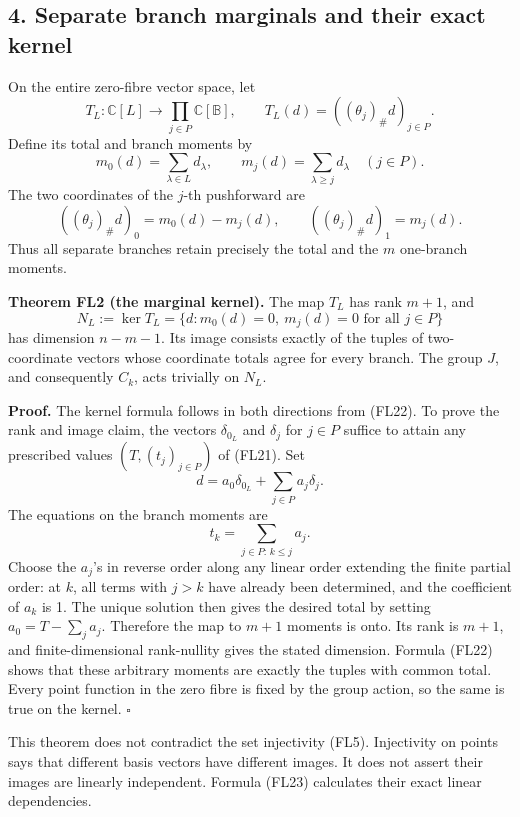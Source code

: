 \documentclass[
  10pt,
]{article}
\begin{document}
\subsection{4. Separate branch marginals and their exact
kernel}\label{separate-branch-marginals-and-their-exact-kernel}

On the entire zero-fibre vector space, let \[
T_L:\mathbb C[L]\longrightarrow\prod_{j\in P}\mathbb C[\mathbb B],
\qquad T_L(d)=((\theta_j)_\#d)_{j\in P}.
\tag{FL20}
\] Define its total and branch moments by \[
m_0(d)=\sum_{\lambda\in L}d_\lambda,
\qquad
m_j(d)=\sum_{\lambda\ge j}d_\lambda\quad(j\in P).
\tag{FL21}
\] The two coordinates of the \(j\)-th pushforward are \[
((\theta_j)_\#d)_0=m_0(d)-m_j(d),\qquad
((\theta_j)_\#d)_1=m_j(d).
\tag{FL22}
\] Thus all separate branches retain precisely the total and the \(m\)
one-branch moments.

\textbf{Theorem FL2 (the marginal kernel).} The map \(T_L\) has rank
\(m+1\), and \[
N_L:=\ker T_L
=\{d:m_0(d)=0,\ m_j(d)=0\text{ for all }j\in P\}
\tag{FL23}
\] has dimension \(n-m-1\). Its image consists exactly of the tuples of
two-coordinate vectors whose coordinate totals agree for every branch.
The group \(J\), and consequently \(C_k\), acts trivially on \(N_L\).

\textbf{Proof.} The kernel formula follows in both directions from
(FL22). To prove the rank and image claim, the vectors \(\delta_{0_L}\)
and \(\delta_j\) for \(j\in P\) suffice to attain any prescribed values
\((T,(t_j)_{j\in P})\) of (FL21). Set \[
d=a_0\delta_{0_L}+\sum_{j\in P}a_j\delta_j.
\] The equations on the branch moments are \[
t_k=\sum_{j\in P:\,k\le j}a_j.
\tag{FL24}
\] Choose the \(a_j\)'s in reverse order along any linear order
extending the finite partial order: at \(k\), all terms with \(j>k\)
have already been determined, and the coefficient of \(a_k\) is 1. The
unique solution then gives the desired total by setting
\(a_0=T-\sum_j a_j\). Therefore the map to \(m+1\) moments is onto. Its
rank is \(m+1\), and finite-dimensional rank-nullity gives the stated
dimension. Formula (FL22) shows that these arbitrary moments are exactly
the tuples with common total. Every point function in the zero fibre is
fixed by the group action, so the same is true on the kernel.
\(\square\)

This theorem does not contradict the set injectivity (FL5). Injectivity
on points says that different basis vectors have different images. It
does not assert their images are linearly independent. Formula (FL23)
calculates their exact linear dependencies.
\end{document}
